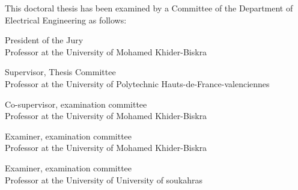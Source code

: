 %
%
%

\begin{titlepage}
\begin{large}
This doctoral thesis has been examined by a Committee of the Department
of Electrical Engineering as follows:

\signature{Pr. Mohamed Boumehraz
}{President of the Jury \\
   Professor at the University of Mohamed Khider-Biskra }
\signature{Pr. Abdelghani Chelihi}{Supervisor, Thesis Committee \\
   Professor at the University of Polytechnic Hauts-de-France-valenciennes}
\signature{Pr. Chouki Sentouh
}{Co-supervisor, examination committee \\
  Professor at the University of Mohamed Khider-Biskra}
\signature{Pr. Achour Betka
}{Examiner, examination committee \\
  Professor at the University of Mohamed Khider-Biskra}
  \signature{Pr. Yahia Kourd
}{Examiner, examination committee \\
  Professor at the University of University of soukahras}
\end{large}
\end{titlepage}



